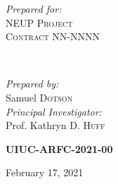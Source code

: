 \begin{titlepage}
       \begin{minipage}{0.4\textwidth}
               \begin{flushleft}
                       \large
                       \textit{Prepared for:}\\
                       \textsc{NEUP Project}\\ %
                        \textsc{Contract} NN-NNNN\\ %
                \end{flushleft}
       \end{minipage}
       ~
       \begin{minipage}{0.4\textwidth}
               \begin{flushright}
                       \large
                       \textit{Prepared by:}\\
                       Samuel \textsc{Dotson} %
                       \vspace{4mm}\\
                       \textit{Principal Investigator:}\\ %
                       Prof. Kathryn D. \textsc{Huff} %
               \end{flushright}
    \end{minipage}


    \vspace{1cm}
    \textsc{\LARGE\bfseries UIUC-ARFC-2021-00} %
    \vspace{0.5cm}


    \vspace{0.5cm} %
    {\large February 17, 2021} %
    \vspace{0.5cm}


\end{titlepage}
